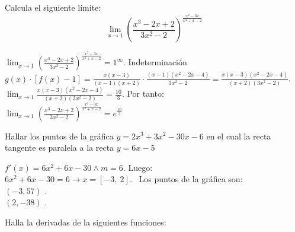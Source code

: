 \documentclass[addpoints,spanish, 12pt,a4paper]{exam}
\begin{document}
\begin{questions}

%
%
%

\question[6] Calcula el siguiente límite: $$\lim_{x \to 1} \left(\frac{x^{3} - 2 x + 2}{3 x^{2} - 2}\right)^{\frac{x^{2} - 3 x}{x^{2} + x - 2}}$$
\begin{solution}
$\lim_{x \to 1} \left(\frac{x^{3} - 2 x + 2}{3 x^{2} - 2}\right)^{\frac{x^{2} - 3 x}{x^{2} + x - 2}}=1^\infty$. Indeterminación \\ $g(x)\cdot\left[f(x)-1\right]=\frac{x \left(x - 3\right)}{\left(x - 1\right) \left(x + 2\right)}\cdot\frac{\left(x - 1\right) \left(x^{2} - 2 x - 4\right)}{3 x^{2} - 2}=\frac{x \left(x - 3\right) \left(x^{2} - 2 x - 4\right)}{\left(x + 2\right) \left(3 x^{2} - 2\right)}$. \\ $\lim_{x \to 1}\frac{x \left(x - 3\right) \left(x^{2} - 2 x - 4\right)}{\left(x + 2\right) \left(3 x^{2} - 2\right)}=\frac{10}{3}$. Por tanto: \\ $\lim_{x \to 1} \left(\frac{x^{3} - 2 x + 2}{3 x^{2} - 2}\right)^{\frac{x^{2} - 3 x}{x^{2} + x - 2}}=e^{\frac{10}{3}}$

\end{solution}
\addpoints

\question[4] Hallar los puntos de la gráfica $y=2 x^{3} + 3 x^{2} - 30 x - 6$ en el cual la recta tangente es paralela a la recta $y=6 x - 5$
\begin{solution}$f'(x)=6 x^{2} + 6 x - 30\land m=6$. Luego: \\ $6 x^{2} + 6 x - 30 = 6 \to x =\left[ -3, \  2\right] $. \ Los puntos de la gráfica son: \\   $\left(-3,57 \right)$ . \\  $\left(2,-38 \right)$ . \\ 
\end{solution}
\addpoints

\question Halla la derivadas de la siguientes funciones:

\end{questions}
\end{document}
